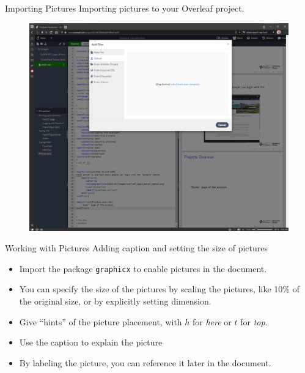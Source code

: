 \documentclass[aspectratio=169]{beamer}
\begin{document}
\begin{frame}{Importing Pictures}
    Importing pictures to your Overleaf project.
    \begin{figure}
        \centering
        \includegraphics[scale=0.18]{images/overleaf_upload_file.png}
        \label{fig:upload_file}
    \end{figure}
\end{frame}

\begin{frame}{Working with Pictures}
    Adding caption and setting the size of pictures
    \begin{itemize}
        \item Import the package \texttt{graphicx} to enable pictures in the document.
        \item You can specify the size of the pictures by scaling the pictures, like 10\% of the original size, or by explicitly setting dimension.
        \item Give ``hints'' of the picture placement, with $h$ for \textit{here} or $t$ for \textit{top}.
        \item Use the caption to explain the picture
        \item By labeling the picture, you can reference it later in the document.
    \end{itemize}
\end{frame}
\end{document}
